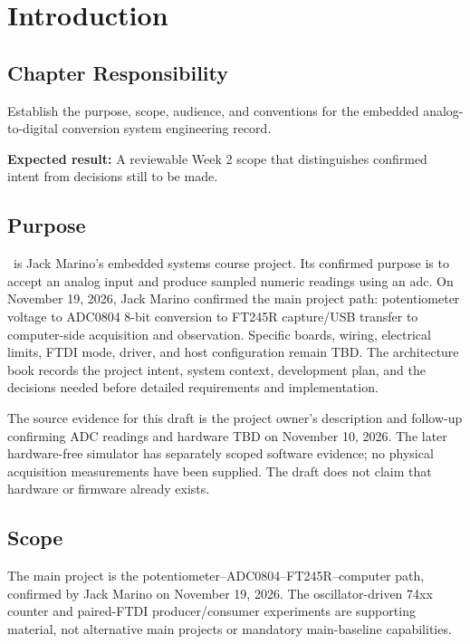 \chapter{Introduction}

\section{Chapter Responsibility}
\label{Section:IntroductionResponsibility}
Establish the purpose, scope, audience, and conventions for the embedded
analog-to-digital conversion system engineering record.

\noindent\textbf{Expected result:} A reviewable Week 2 scope that distinguishes
confirmed intent from decisions still to be made.

\section{Purpose}
\ProjectName\ is Jack Marino's embedded systems course project. Its confirmed
purpose is to accept an analog input and produce sampled numeric readings
using an \gls{adc}. On November 19, 2026, Jack Marino confirmed the main
project path: potentiometer voltage to ADC0804 8-bit conversion to FT245R
capture/USB transfer to computer-side acquisition and observation. Specific
boards, wiring, electrical limits, FTDI mode, driver, and host configuration
remain TBD.
The architecture book records the project intent, system context, development
plan, and the decisions needed before detailed requirements and implementation.

The source evidence for this draft is the project owner's description and
follow-up confirming ADC readings and hardware TBD on November 10, 2026.
The later hardware-free simulator has separately scoped software evidence;
no physical acquisition measurements have been supplied. The draft does not claim that hardware or firmware already exists.

\section{Scope}
The main project is the potentiometer--ADC0804--FT245R--computer path,
confirmed by Jack Marino on November 19, 2026. The oscillator-driven 74xx
counter and paired-FTDI producer/consumer experiments are supporting material,
not alternative main projects or mandatory main-baseline capabilities.

